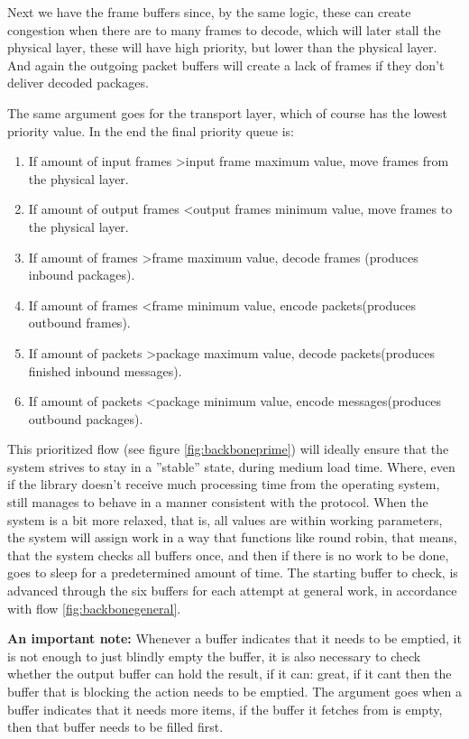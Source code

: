 Next we have the frame buffers since, by the same logic, these can create congestion when there are to many frames to decode, which will later stall the physical layer, these will have high priority, but lower than the physical layer.
And again the outgoing packet buffers will create a lack of frames if they don't deliver decoded packages.

The same argument goes for the transport layer, which of course has the lowest priority value.
 In the end the final priority queue is:

\begin{enumerate}
\item If amount of input frames \textgreater input frame maximum value, move frames from the physical layer.
\item If amount of output frames \textless output frames minimum value, move frames to the physical layer.
\item If amount of frames \textgreater frame maximum value, decode frames (produces inbound packages).
\item If amount of frames \textless frame minimum value, encode packets(produces outbound frames).
\item If amount of packets \textgreater package maximum value, decode packets(produces finished inbound messages).
\item If amount of packets \textless package minimum value, encode messages(produces outbound packages).
\end{enumerate}
This prioritized flow (see figure \ref{fig:backboneprime}) will ideally ensure that the system strives to stay in a ''stable'' state, during medium load time. Where, even if the library doesn't receive much processing time from the operating system, still manages to behave in a manner consistent with the protocol.
When the system is a bit more relaxed, that is, all values are within working parameters, the system will assign work in a way that functions like round robin, that means, that the system checks all buffers once, and then if there is no work to be done, goes to sleep for a predetermined amount of time. The starting buffer to check, is advanced through the six buffers for each attempt at general work, in accordance with flow \ref{fig:backbonegeneral}.




\textbf{An important note:}
Whenever a buffer indicates that it needs to be emptied, it is not enough to just blindly empty the buffer, it is also necessary to check whether the output buffer can hold the result, if it can: great, if it cant then the buffer that is blocking the action needs to be emptied.
The argument goes when a buffer indicates that it needs more items, if the buffer it fetches from is empty, then that buffer needs to be filled first.


